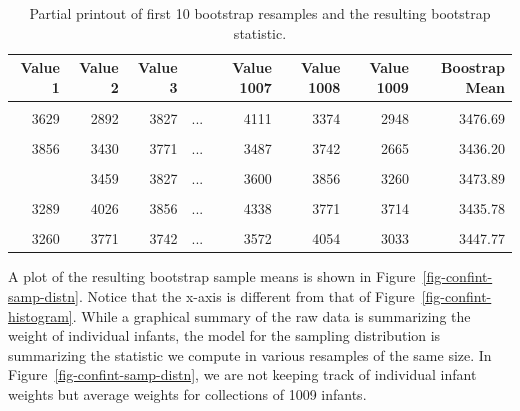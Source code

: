 \documentclass[
  letterpaper,
  DIV=11,
  numbers=noendperiod]{scrreprt}
\theoremstyle{plain}
\theoremstyle{definition}
\theoremstyle{definition}
\theoremstyle{remark}
\begin{document}
\hypertarget{tbl-confint-bootstrap}{}
\begin{table}
\caption{\label{tbl-confint-bootstrap}Partial printout of first 10 bootstrap resamples and the resulting
bootstrap statistic. }\tabularnewline

\centering
\begin{tabular}[t]{rrrlrrrr}
\toprule
Value 1 & Value 2 & Value 3 &         & Value 1007 & Value 1008 & Value 1009 & Boostrap Mean\\
\midrule
\cellcolor{gray!6}{3345} & \cellcolor{gray!6}{3572} & \cellcolor{gray!6}{3572} & \cellcolor{gray!6}{...} & \cellcolor{gray!6}{3827} & \cellcolor{gray!6}{3827} & \cellcolor{gray!6}{3119} & \cellcolor{gray!6}{3461.89}\\
3629 & 2892 & 3827 & ... & 4111 & 3374 & 2948 & 3476.69\\
\cellcolor{gray!6}{2495} & \cellcolor{gray!6}{3686} & \cellcolor{gray!6}{3827} & \cellcolor{gray!6}{...} & \cellcolor{gray!6}{3289} & \cellcolor{gray!6}{3544} & \cellcolor{gray!6}{3487} & \cellcolor{gray!6}{3428.90}\\
3856 & 3430 & 3771 & ... & 3487 & 3742 & 2665 & 3436.20\\
\cellcolor{gray!6}{3430} & \cellcolor{gray!6}{3119} & \cellcolor{gray!6}{4479} & \cellcolor{gray!6}{...} & \cellcolor{gray!6}{3686} & \cellcolor{gray!6}{3090} & \cellcolor{gray!6}{3005} & \cellcolor{gray!6}{3451.09}\\
\addlinespace
3289 & 3459 & 3827 & ... & 3600 & 3856 & 3260 & 3473.89\\
\cellcolor{gray!6}{2863} & \cellcolor{gray!6}{3345} & \cellcolor{gray!6}{3232} & \cellcolor{gray!6}{...} & \cellcolor{gray!6}{3345} & \cellcolor{gray!6}{3544} & \cellcolor{gray!6}{2948} & \cellcolor{gray!6}{3427.89}\\
3289 & 4026 & 3856 & ... & 4338 & 3771 & 3714 & 3435.78\\
\cellcolor{gray!6}{3175} & \cellcolor{gray!6}{3544} & \cellcolor{gray!6}{3771} & \cellcolor{gray!6}{...} & \cellcolor{gray!6}{3572} & \cellcolor{gray!6}{3515} & \cellcolor{gray!6}{3005} & \cellcolor{gray!6}{3419.37}\\
3260 & 3771 & 3742 & ... & 3572 & 4054 & 3033 & 3447.77\\
\bottomrule
\end{tabular}
\end{table}

A plot of the resulting bootstrap sample means is shown in
Figure~\ref{fig-confint-samp-distn}. Notice that the x-axis is different
from that of Figure~\ref{fig-confint-histogram}. While a graphical
summary of the raw data is summarizing the weight of individual infants,
the model for the sampling distribution is summarizing the statistic we
compute in various resamples of the same size. In
Figure~\ref{fig-confint-samp-distn}, we are not keeping track of
individual infant weights but average weights for collections of 1009
infants.
\end{document}
